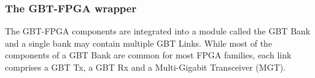 \subsubsection{The GBT-FPGA wrapper}
The GBT-FPGA components are integrated into a module called the GBT Bank and a single bank may contain multiple GBT Links. While most of the components of a GBT Bank are common for most FPGA families, each link comprises a GBT Tx, a GBT Rx and a Multi-Gigabit Transceiver (MGT). 